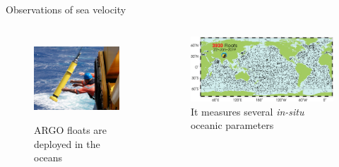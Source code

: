\documentclass[handout]{beamer}
\begin{document}
\begin{frame}{Observations of sea velocity}
    \begin{columns}
          \begin{figure}
        \centering
        \caption*{ARGO floats are deployed in the oceans}
         \includegraphics[width=.7\textwidth]{fig/L3/argo-float.jpg}\\
         \end{figure}
         \pause
\begin{figure}
         \caption*{It measures several \textit{in-situ}  oceanic parameters}
         \includegraphics[width=\textwidth]{fig/L3/argo-status.png}
    \end{figure}

    \end{columns}
    

\end{frame}
\end{document}
